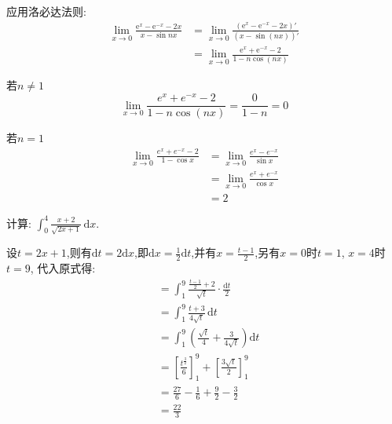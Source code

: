 \begin{questions}
	\begin{solution}
		应用洛必达法则:
		\begin{align*}
			\lim_{x\to0}\frac{\mathrm{e}^x - \mathrm{e}^{-x} - 2x}{x - \sin{nx}}
			 & = \lim_{x\to0}\frac{(\mathrm{e}^x - \mathrm{e}^{-x} - 2x)'}{(x - \sin(nx))'} \\
			 & = \lim_{x\to0}\frac{\mathrm{e}^x + \mathrm{e}^{-x} - 2}{1 - n\cos(nx)}
		\end{align*}
		\begin{penum}
			\item 若$n\neq1$
			      \begin{equation*}
				      \lim_{x\to0}\frac{e^x+e^{-x} - 2}{1-n\cos(nx)} = \frac{0}{1-n} = 0
			      \end{equation*}
			\item 若$n=1$
			      \begin{align*}
				      \lim_{x\to0}\frac{e^x+e^{-x} - 2}{1-\cos{x}} & = \lim_{x\to0}\frac{e^x - e^{-x}}{\sin{x}} \\
				                                                   & = \lim_{x\to0}\frac{e^x + e^{-x}}{\cos{x}} \\
				                                                   & = 2
			      \end{align*}
		\end{penum}
	\end{solution}

	\question 计算: $\displaystyle \int_0^4\frac{x+2}{\sqrt{2x+1}}\,\mathrm{d}x$.

	\begin{solution}
		设$t=2x+1$,则有$\mathrm{d}t = 2\mathrm{d}x$,即$\mathrm{d}x =
			\frac12\mathrm{d}t$,并有$x=\frac{t-1}2$,另有$x=0$时$t=1$, $x=4$时$t=9$,
		代入原式得:
		\begin{align*}
			 & = \int_1^9\frac{\frac{t-1}{2}+2}{\sqrt{t}}\cdot\frac{\mathrm{d}t}{2}            \\
			 & = \int_1^9\frac{t+3}{4\sqrt{t}}\,\mathrm{d}t                                    \\
			 & = \int_1^9(\frac{\sqrt{t}}{4} + \frac{3}{4\sqrt{t}})\mathrm{d}t                 \\
			 & = \left[\frac{t^{\frac32}}{6}\right]_1^9 + \left[\frac{3\sqrt{t}}{2}\right]_1^9 \\
			 & = \frac{27}{6} - \frac{1}{6} + \frac{9}{2} - \frac{3}{2}                        \\
			 & = \frac{22}{3}
		\end{align*}
	\end{solution}
\end{questions}
